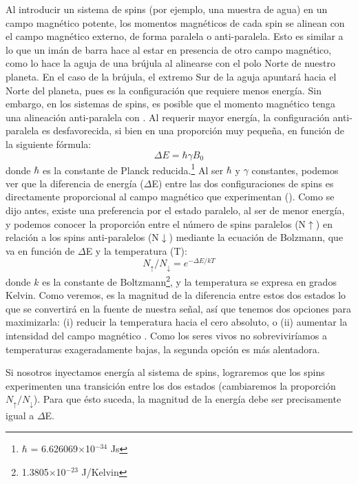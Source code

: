 Al introducir un sistema de spins (por ejemplo, una muestra de agua) en un campo magnético potente, los momentos magnéticos de cada spin se alinean con el campo magnético externo, \Bzero de forma paralela o anti-paralela. Esto es similar a lo que un imán de barra hace al estar en presencia de otro campo magnético, como lo hace la aguja de una brújula al alinearse con el polo Norte de nuestro planeta. En el caso de la brújula, el extremo Sur de la aguja apuntará hacia el Norte del planeta, pues es la configuración que requiere menos energía. Sin embargo, en los sistemas de spins, es posible que el momento magnético tenga una alineación anti-paralela con \Bzero. Al requerir mayor energía, la configuración anti-paralela es desfavorecida, si bien en una proporción muy pequeña, en función de la siguiente fórmula:
\begin{equation}
 \Delta E = \hbar \gamma B_0
\end{equation}
donde $\hbar$ es la constante de Planck reducida.\footnote{$\hbar$ = 6.626069$\times$10$^{-34}$ Js} Al ser $\hbar$ y $\gamma$ constantes, podemos ver que la diferencia de energía ($\Delta$E) entre las dos configuraciones de spins es directamente proporcional al campo magnético que experimentan (\Bzero). Como se dijo antes, existe una preferencia por el estado paralelo, al ser de menor energía, y podemos conocer la proporción entre el número de spins paralelos (N$\uparrow$) en relación a los spins anti-paralelos (N$\downarrow$) mediante la ecuación de Bolzmann, que va en función de $\Delta$E y la temperatura (T):
\begin{equation}
 \label{eq_Boltzmann}
 N_{\uparrow} / N_{\downarrow} = e^{-\Delta E / kT}
\end{equation}
donde $k$ es la constante de Boltzmann\footnote{1.3805$\times$10$^{-23}$ J/Kelvin}, y la temperatura se expresa en grados Kelvin. Como veremos, es la magnitud de la diferencia entre estos dos estados lo que se convertirá en la fuente de nuestra señal, así que tenemos dos opciones para maximizarla: (i) reducir la temperatura hacia el cero absoluto, o (ii) aumentar la intensidad del campo magnético \Bzero. Como los seres vivos no sobreviviríamos a temperaturas exageradamente bajas, la segunda opción es más alentadora.

Si nosotros inyectamos energía al sistema de spins, lograremos que los spins experimenten una transición entre los dos estados (cambiaremos la proporción $N_{\uparrow}/N_{\downarrow}$). Para que ésto suceda, la magnitud de la energía debe ser precisamente igual a $\Delta$E. 




